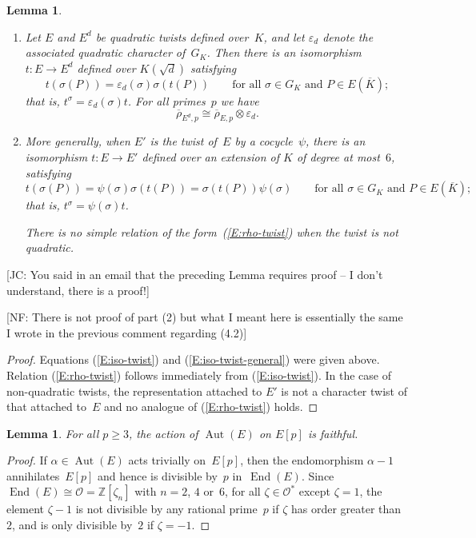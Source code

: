 \documentclass[12pt, reqno]{amsart}
\newcommand{\Z}{\mathbb{Z}}
\newcommand{\Kbar}{{\overline{K}}}
\newcommand{\rhobar}{{\overline{\rho}}}
\newcommand{\eps}{\varepsilon}
\newcommand{\calO}{\mathcal{O}}
\DeclareMathOperator{\Aut}{Aut}
\DeclareMathOperator{\End}{End}
\numberwithin{equation}{section}
\newtheorem{lemma}[theorem]{Lemma}
\theoremstyle{definition}
\theoremstyle{remark}
\newcommand{\nf}[1]{{\color{blue} \textsf{[NF: #1]}}}
\newcommand{\jc}[1]{{\color{darkgreen} \textsf{[JC: #1]}}}
\begin{document}
\begin{lemma}\label{L:twist-rep}
  \begin{enumerate}
    \item
  Let $E$ and $E^d$ be quadratic twists defined over~$K$, and let
  $\eps_d$ denote the associated quadratic character of~$G_K$.  Then
  there is an isomorphism $t :E\to E^d$ defined over $K(\sqrt{d})$
  satisfying
\begin{equation}\label{E:iso-twist}
t (\sigma(P)) = \eps_d(\sigma)\sigma(t (P))\qquad\text{for
  all~$\sigma\in G_K$ and $P\in E(\Kbar)$};
\end{equation}
that is, $t ^{\sigma} = \eps_d(\sigma)t $.  For all primes~$p$ we have
\begin{equation} \label{E:rho-twist}
  \rhobar_{E^d,p} \cong \rhobar_{E,p}\otimes\eps_d.
\end{equation}
\item More generally, when $E'$ is the twist of~$E$ by a
  cocycle~$\psi$, there is an isomorphism $t :E\to E'$ defined
  over an extension of $K$ of degree at most~$6$, satisfying
  \begin{equation}\label{E:iso-twist-general}
t (\sigma(P)) = \psi(\sigma)\sigma(t (P)) =
\sigma(t (P))\psi(\sigma)\qquad\text{for all~$\sigma\in G_K$ and
  $P\in E(\Kbar)$};
  \end{equation}
  that is, $t ^{\sigma} = \psi(\sigma)t $.

  There is no simple relation of the form~(\ref{E:rho-twist}) when the
twist is not quadratic.
  \end{enumerate}

\end{lemma}

\jc{You said in an email that the preceding Lemma requires proof -- I
  don't understand, there is a proof!}
  
\nf{There is not proof of part (2) but what I meant here is essentially the same I wrote in the previous comment regarding (4.2)}  

\begin{proof}
Equations (\ref{E:iso-twist}) and (\ref{E:iso-twist-general}) were
given above.  Relation (\ref{E:rho-twist}) follows immediately from
(\ref{E:iso-twist}).  In the case of non-quadratic twists, the
representation attached to $E'$ is not a character twist of that
attached to~$E$ and no analogue of (\ref{E:rho-twist}) holds.
\end{proof}

\begin{lemma} \label{L:faithful}
  For all $p\ge3$, the action of $\Aut(E)$ on $E[p]$ is faithful.
\end{lemma}
\begin{proof}
If $\alpha\in\Aut(E)$ acts trivially on~$E[p]$, then the endomorphism
$\alpha-1$ annihilates~$E[p]$ and hence is divisible by~$p$
in~$\End(E)$.  Since $\End(E)\cong\calO=\Z[\zeta_n]$ with $n=2$, $4$
or~$6$, for all $\zeta\in \calO^*$ except $\zeta=1$, the element
$\zeta-1$ is not divisible by any rational prime~$p$ if $\zeta$
has order greater than~$2$, and is only divisible by~$2$ if
$\zeta=-1$.
\end{proof}
\end{document}
